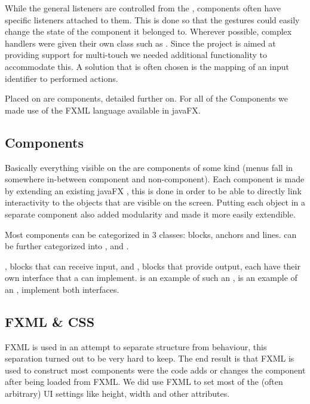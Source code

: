 While the general listeners are controlled from the , components often have specific listeners attached to them.
This is done so that the gestures could easily change the state of the component it belonged to. Wherever possible, complex handlers were given their own class such as . Since the project is aimed at providing support for multi-touch we needed additional functionality to accommodate this. A solution that is often chosen is the mapping of an input identifier to performed actions.

Placed on  are components, detailed further on. For all of the Components we made use of the FXML language available in javaFX.

\subsection{Components}
Basically everything visible on the  are components of some kind (menus fall in somewhere in-between component and non-component).
Each component is made by extending an existing javaFX , this is done in order to be able to directly link interactivity to the objects that are visible on the screen.
Putting each object in a separate component also added modularity and made it more easily extendible.

Most components can be categorized in 3 classes: blocks, anchors and lines.
 can be further categorized into ,  and .

, blocks that can receive input, and , blocks that provide output, each have their own interface that a  can implement.  is an example of such an ,  is an example of an ,  implement both interfaces.


\subsection{FXML \& CSS}
FXML is used in an attempt to separate structure from behaviour, this separation turned out to be very hard to keep. The end result is that FXML is used to construct most components were the code adds or changes the component after being loaded from FXML. We did use FXML to set most of the (often arbitrary) UI settings like height, width and other attributes.

